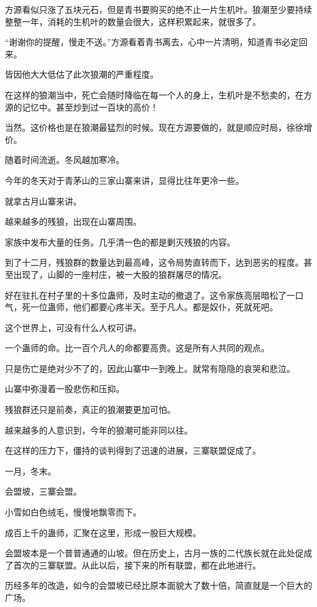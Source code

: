 \begin{this_body}
方源看似只涨了五块元石，但是青书要购买的绝不止一片生机叶。狼潮至少要持续整整一年，消耗的生机叶的数量会很大，这样积累起来，就很多了。

“谢谢你的提醒，慢走不送。”方源看着青书离去，心中一片清明，知道青书必定回来。

皆因他大大低估了此次狼潮的严重程度。

在这样的狼潮当中，死亡会随时降临在每一个人的身上，生机叶是不愁卖的，在方源的记忆中。甚至炒到过一百块的高价！

当然。这价格也是在狼潮最猛烈的时候。现在方源要做的，就是顺应时局，徐徐增价。

随着时间流逝。冬风越加寒冷。

今年的冬天对于青茅山的三家山寨来讲，显得比往年更冷一些。

就拿古月山寨来讲。

越来越多的残狼，出现在山寨周围。

家族中发布大量的任务。几乎清一色的都是剿灭残狼的内容。

到了十二月，残狼群的数量达到最高峰，这令局势直转而下，达到恶劣的程度。甚至出现了，山脚的一座村庄，被一大股的狼群屠尽的情况。

好在驻扎在村子里的十多位蛊师，及时主动的撤退了。这令家族高层暗松了一口气，死一位蛊师，他们都要心疼半天。至于凡人。都是奴仆，死就死吧。

这个世界上，可没有什么人权可讲。

一个蛊师的命。比一百个凡人的命都要高贵。这是所有人共同的观点。

只是伤亡是绝对少不了的，因此山寨中一到晚上。就常有隐隐的哀哭和悲泣。

山寨中弥漫着一股悲伤和压抑。

残狼群还只是前奏，真正的狼潮要更加可怕。

越来越多的人意识到，今年的狼潮可能非同以往。

在这样的压力下，僵持的谈判得到了迅速的进展，三寨联盟促成了。

一月，冬末。

会盟坡，三寨会盟。

小雪如白色绒毛，慢慢地飘零而下。

成百上千的蛊师，汇聚在这里，形成一股巨大规模。

会盟坡本是一个普普通通的山坡。但在历史上，古月一族的二代族长就在此处促成了首次的三寨联盟。从此以后，接下来的所有联盟，都在此地进行。

历经多年的改造，如今的会盟坡已经比原本面貌大了数十倍，简直就是一个巨大的广场。


\end{this_body}
